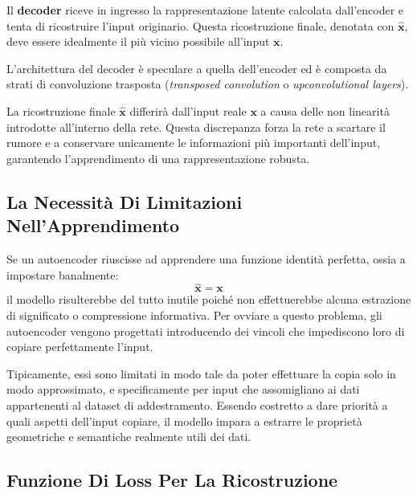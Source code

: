 ﻿\documentclass[11pt, a4paper]{article}
\begin{document}
Il \textbf{decoder} riceve in ingresso la rappresentazione latente calcolata dall'encoder e tenta di ricostruire l'input originario. Questa ricostruzione finale, denotata con $\bm{\hat{x}}$, deve essere idealmente il più vicino possibile all'input $\bm{x}$.

L'architettura del decoder è speculare a quella dell'encoder ed è composta da strati di convoluzione trasposta (\emph{transposed convolution} o \emph{upconvolutional layers}).

La ricostruzione finale $\bm{\hat{x}}$ differirà dall'input reale $\bm{x}$ a causa delle non linearità introdotte all'interno della rete. Questa discrepanza forza la rete a scartare il rumore e a conservare unicamente le informazioni più importanti dell'input, garantendo l'apprendimento di una rappresentazione robusta.


\subsection{La Necessità Di Limitazioni Nell'Apprendimento}

Se un autoencoder riuscisse ad apprendere una funzione identità perfetta, ossia a impostare banalmente:
\[
\bm{\hat{x}} = \bm{x}
\]
il modello risulterebbe del tutto inutile poiché non effettuerebbe alcuna estrazione di significato o compressione informativa. Per ovviare a questo problema, gli autoencoder vengono progettati introducendo dei vincoli che impediscono loro di copiare perfettamente l'input.

Tipicamente, essi sono limitati in modo tale da poter effettuare la copia solo in modo approssimato, e specificamente per input che assomigliano ai dati appartenenti al dataset di addestramento. Essendo costretto a dare priorità a quali aspetti dell'input copiare, il modello impara a estrarre le proprietà geometriche e semantiche realmente utili dei dati.


\subsection{Funzione Di Loss Per La Ricostruzione}
\end{document}

